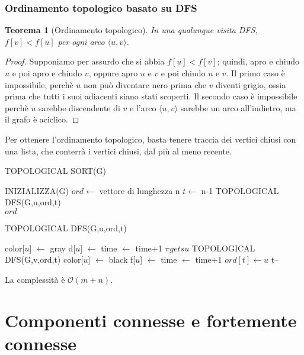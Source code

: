 \documentclass[11pt]{article}
\newtheorem*{theorem}{Teorema}
\theoremstyle{proprietà}
\begin{document}
\subsubsection{Ordinamento topologico basato su DFS}
\begin{theorem}[Ordinamento topologico]
    In una qualunque visita DFS, $f[v]<f[u]$ per ogni arco $\langle u,v \rangle$.
\end{theorem}
\begin{proof}
    Supponiamo per assurdo che si abbia $f[u]<f[v]$; quindi, apro e chiudo $u$ e poi apro e chiudo $v$, oppure apro $u$ 
    e $v$ e poi chiudo $u$ e $v$. Il primo caso è impossibile, perchè $u$ non può diventare nero prima che $v$ diventi 
    grigio, ossia prima che tutti i suoi adiacenti siano stati scoperti. Il secondo caso è impossibile perchè $u$ sarebbe 
    discendente di $v$ e l'arco $\langle u,v \rangle$ sarebbe un arco all'indietro, ma il grafo è aciclico.
\end{proof}
Per ottenere l'ordinamento topologico, basta tenere traccia dei vertici chiusi con una lista, che conterrà i vertici chiusi, 
dal più al meno recente.
\begin{algorithm}[H]
    \caption{TOPOLOGICAL SORT(G)}
    \begin{algorithmic}
        \State INIZIALIZZA(G)
        \State $ord \gets$ vettore di lunghezza n 
        \State $t \gets$ n-1
                \State TOPOLOGICAL DFS(G,u,ord,t)
            \EndIf
        \EndFor\\
        \Return $ord$
    \end{algorithmic}
\end{algorithm}
\begin{algorithm}[H]
    \caption{TOPOLOGICAL DFS(G,u,ord,t)}
    \begin{algorithmic}
        \State color[$u$] $\gets$ gray 
        \State d[$u$] $\gets$ time $\gets$ time+1
                \State $\pi gets u$
                \State TOPOLOGICAL DFS(G,v,ord,t)
            \EndIf 
        \EndFor 
        \State color[$u$] $\gets$ black 
        \State f[$u$] $\gets$ time $\gets$ time+1
        \State $ord[t] \gets u$
        \State t--
    \end{algorithmic}
\end{algorithm}
La complessità è $\mathcal{O}(m+n)$.
\section{Componenti connesse e fortemente connesse}
\end{document}
